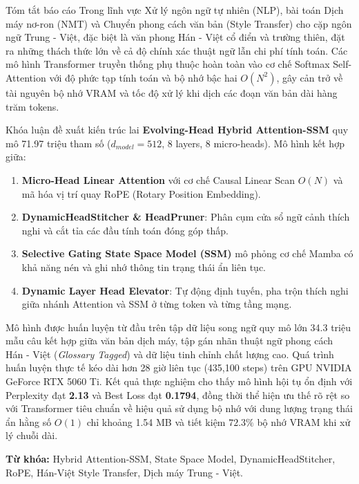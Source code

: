 \documentclass{uetgraduation}
\begin{document}
\begin{preamble}{Tóm tắt báo cáo}
Trong lĩnh vực Xử lý ngôn ngữ tự nhiên (NLP), bài toán Dịch máy nơ-ron (NMT) và Chuyển phong cách văn bản (Style Transfer) cho cặp ngôn ngữ Trung - Việt, đặc biệt là văn phong Hán - Việt cổ điển và trường thiên, đặt ra những thách thức lớn về cả độ chính xác thuật ngữ lẫn chi phí tính toán. Các mô hình Transformer truyền thống phụ thuộc hoàn toàn vào cơ chế Softmax Self-Attention với độ phức tạp tính toán và bộ nhớ bậc hai $O(N^2)$, gây cản trở về tài nguyên bộ nhớ VRAM và tốc độ xử lý khi dịch các đoạn văn bản dài hàng trăm tokens.

Khóa luận đề xuất kiến trúc lai \textbf{Evolving-Head Hybrid Attention-SSM} quy mô 71.97 triệu tham số ($d_{model}=512$, 8 layers, 8 micro-heads). Mô hình kết hợp giữa:
\begin{enumerate}
    \item \textbf{Micro-Head Linear Attention} với cơ chế Causal Linear Scan $O(N)$ và mã hóa vị trí quay RoPE (Rotary Position Embedding).
    \item \textbf{DynamicHeadStitcher \& HeadPruner}: Phân cụm cửa sổ ngữ cảnh thích nghi và cắt tỉa các đầu tính toán đóng góp thấp.
    \item \textbf{Selective Gating State Space Model (SSM)} mô phỏng cơ chế Mamba có khả năng nén và ghi nhớ thông tin trạng thái ẩn liên tục.
    \item \textbf{Dynamic Layer Head Elevator}: Tự động định tuyến, pha trộn thích nghi giữa nhánh Attention và SSM ở từng token và từng tầng mạng.
\end{enumerate}

Mô hình được huấn luyện từ đầu trên tập dữ liệu song ngữ quy mô lớn 34.3 triệu mẫu câu kết hợp giữa văn bản dịch máy, tập gán nhãn thuật ngữ phong cách Hán - Việt (\textit{Glossary Tagged}) và dữ liệu tinh chỉnh chất lượng cao. Quá trình huấn luyện thực tế kéo dài hơn 28 giờ liên tục (435,100 steps) trên GPU NVIDIA GeForce RTX 5060 Ti. Kết quả thực nghiệm cho thấy mô hình hội tụ ổn định với Perplexity đạt \textbf{2.13} và Best Loss đạt \textbf{0.1794}, đồng thời thể hiện ưu thế rõ rệt so với Transformer tiêu chuẩn về hiệu quả sử dụng bộ nhớ với dung lượng trạng thái ẩn hằng số $O(1)$ chỉ khoảng 1.54 MB và tiết kiệm $72.3\%$ bộ nhớ VRAM khi xử lý chuỗi dài.

\vspace{0.5cm}
\textbf{Từ khóa:} Hybrid Attention-SSM, State Space Model, DynamicHeadStitcher, RoPE, Hán-Việt Style Transfer, Dịch máy Trung - Việt.
\end{preamble}
\end{document}
